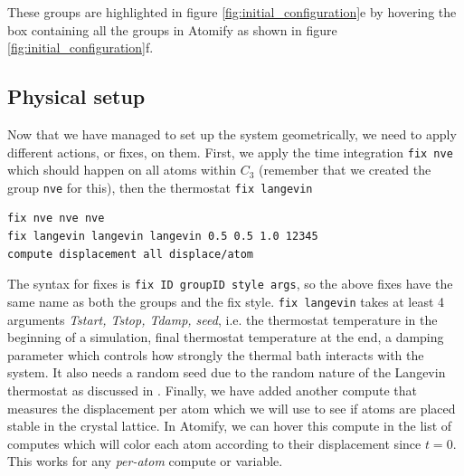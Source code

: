\documentclass[12pt,a4paper,final]{iopart}
\newcommand{\code}[1]{\colorbox{light-gray}{\color{RawSienna}\texttt{#1}}}
\begin{document}
These groups are highlighted in figure \ref{fig:initial_configuration}e by hovering the
box containing all the groups in Atomify as shown in figure \ref{fig:initial_configuration}f.

\subsection{Physical setup}
Now that we have managed to set up the system geometrically, 
we need to apply different actions, or fixes, on them.
First, we apply the time integration \code{fix nve} which
should happen on all atoms within $C_3$ (remember that we created the group \code{nve} for this),
then the thermostat \code{fix langevin}

\begin{lstlisting}
fix nve nve nve
fix langevin langevin langevin 0.5 0.5 1.0 12345
compute displacement all displace/atom
\end{lstlisting}

The syntax for fixes is \code{fix ID groupID style args}, so the above fixes have the same name as both the groups and the fix style.
\code{fix langevin} takes at least 4 arguments \textit{Tstart, Tstop, Tdamp, seed}, i.e.
the thermostat temperature in the beginning of a simulation, final thermostat temperature at the end, a damping parameter which controls how strongly the thermal bath interacts with the system.
It also needs a random seed due to the random nature of the Langevin thermostat as discussed in \cite{schneider1978molecular}.
Finally, we have added another compute that measures the displacement per atom which we will use to see if atoms are placed stable in the crystal lattice.
In Atomify, we can hover this compute in the list of computes which will color each atom according to their displacement since $t=0$.
This works for any \textit{per-atom} compute or variable.
\end{document}
